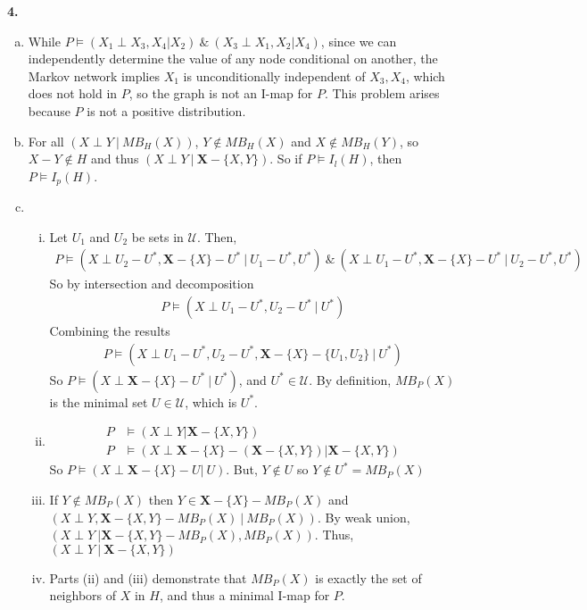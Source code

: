 \documentclass{article}
\begin{document}
\textbf{4.} \begin{enumerate}[(a)]
    \item While $P \vDash (X_1 \perp X_3, X_4| X_2)\ \& \ (X_3 \perp X_1, X_2| X_4)$, since we can independently determine the value of any node conditional on another, the Markov network implies $X_1$ is unconditionally independent of $X_3, X_4$, which does not hold in $P$, so the graph is not an I-map for $P$. This problem arises because $P$ is not a positive distribution. 
    \item For all $(X \perp Y\ |\ MB_H(X))$, $Y \notin MB_H(X)$ and $X \notin MB_H(Y)$, so $X - Y \notin H$ and thus $(X \perp Y\ |\ \mathbf{X} - \{X, Y \})$. So if $P \vDash I_{l}(H)$, then $P \vDash I_{p}(H)$.
    \item \begin{enumerate}[(i)]
        \item Let $U_1$ and $U_2$ be sets in $\mathcal{U}$. Then, \begin{align*}
            P \vDash (X \perp U_2 - U^*, \mathbf{X} - \{X\} - U^*\ |\ U_1 - U^*, U^*)\ \&  \ (X \perp U_1 - U^*, \mathbf{X} - \{X\} - U^*\ |\ U_2 - U^*, U^*)
        \end{align*}
        So by intersection and decomposition \begin{align*}
            P \vDash (X \perp U_1 - U^*, U_2 - U^* \ |\ U^*)
        \end{align*}
        Combining the results \begin{align*}
            P \vDash (X \perp U_1 - U^*, U_2 - U^*, \mathbf{X} - \{X\} - \{U_1, U_2\}\ |\ U^*)
        \end{align*}
        So $P \vDash (X \perp \mathbf{X} - \{X\} - U^*\ | \ U^*)$, and $U^* \in \mathcal{U}$. By definition, $MB_P(X)$ is the minimal set $U \in \mathcal{U}$, which is $U^*$. 
        \item \begin{align*}
            P &\vDash (X \perp Y | \mathbf{X} - \{X, Y\}) \\
            P &\vDash (X \perp \mathbf{X} - \{X\} - (\mathbf{X} - \{X, Y\}) | \mathbf{X} - \{X, Y\})
        \end{align*} 
        So $P \vDash (X \perp \mathbf{X} - \{X\} - U |\ U)$. But, $Y \notin U$ so $Y \notin U^* =  MB_P(X)$
        \item If $Y \notin MB_P(X)$ then $Y \in \mathbf{X} - \{X\} - MB_P(X)$ and $(X \perp Y, \mathbf{X} - \{X, Y\} - MB_P(X)\ |\ MB_P(X) )$. By weak union, $(X \perp Y\ |\mathbf{X} - \{X, Y\} - MB_P(X), MB_P(X))$. Thus, $(X \perp Y\ |\ \mathbf{X} - \{X, Y\})$
        \item Parts (ii) and (iii) demonstrate that $MB_P(X)$ is exactly the set of neighbors of $X$ in $H$, and thus a minimal I-map for $P$.
    \end{enumerate}
\end{enumerate}
\end{document}
